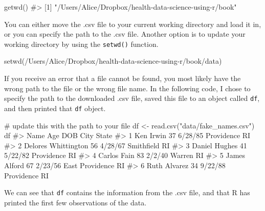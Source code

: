 \documentclass[
  letterpaper,
]{latex/krantz}
\makeatletter
\newenvironment{Shaded}{\begin{snugshade}}{\end{snugshade}}
\newcommand{\CommentTok}[1]{\textcolor[rgb]{0.37,0.37,0.37}{#1}}
\newcommand{\FunctionTok}[1]{\textcolor[rgb]{0.28,0.35,0.67}{#1}}
\newcommand{\NormalTok}[1]{\textcolor[rgb]{0.00,0.23,0.31}{#1}}
\newcommand{\OtherTok}[1]{\textcolor[rgb]{0.00,0.23,0.31}{#1}}
\newcommand{\StringTok}[1]{\textcolor[rgb]{0.13,0.47,0.30}{#1}}
\newenvironment{kframe}{%
\medskip{}
\setlength{\fboxsep}{.8em}
 \def\at@end@of@kframe{}%
 \ifinner\ifhmode%
  \def\at@end@of@kframe{\end{minipage}}%
  \begin{minipage}{\columnwidth}%
 \fi\fi%
 \def\FrameCommand##1{\hskip\@totalleftmargin \hskip-\fboxsep
 \colorbox{shadecolor}{##1}\hskip-\fboxsep
     \hskip-\linewidth \hskip-\@totalleftmargin \hskip\columnwidth}%
 \MakeFramed {\advance\hsize-\width
   \@totalleftmargin\z@ \linewidth\hsize
   \@setminipage}}%
 {\par\unskip\endMakeFramed%
 \at@end@of@kframe}
\renewenvironment{Shaded}{\begin{kframe}}{\end{kframe}}
\makeatother
\begin{document}
\begin{Shaded}
\begin{Highlighting}[]
\FunctionTok{getwd}\NormalTok{()}
\CommentTok{\#\textgreater{} [1] "/Users/Alice/Dropbox/health{-}data{-}science{-}using{-}r/book"}
\end{Highlighting}
\end{Shaded}

You can either move the .csv file to your current working directory and
load it in, or you can specify the path to the .csv file. Another option
is to update your working directory by using the
\texttt{setwd()} function.

\begin{Shaded}
\begin{Highlighting}[]
\FunctionTok{setwd}\NormalTok{(}\StringTok{\textquotesingle{}/Users/Alice/Dropbox/health{-}data{-}science{-}using{-}r/book/data\textquotesingle{}}\NormalTok{)}
\end{Highlighting}
\end{Shaded}

If you receive an error that a file cannot be found, you most likely
have the wrong path to the file or the wrong file name. In the following
code, I chose to specify the path to the downloaded .csv file, saved
this file to an object called \texttt{df}, and then printed that
\texttt{df} object.

\begin{Shaded}
\begin{Highlighting}[]
\CommentTok{\# update this with the path to your file}
\NormalTok{df }\OtherTok{\textless{}{-}} \FunctionTok{read.csv}\NormalTok{(}\StringTok{"data/fake\_names.csv"}\NormalTok{) }
\NormalTok{df}
\CommentTok{\#\textgreater{}                  Name Age     DOB            City State}
\CommentTok{\#\textgreater{} 1           Ken Irwin  37 6/28/85      Providence    RI}
\CommentTok{\#\textgreater{} 2 Delores Whittington  56 4/28/67      Smithfield    RI}
\CommentTok{\#\textgreater{} 3       Daniel Hughes  41 5/22/82      Providence    RI}
\CommentTok{\#\textgreater{} 4         Carlos Fain  83  2/2/40          Warren    RI}
\CommentTok{\#\textgreater{} 5        James Alford  67 2/23/56 East Providence    RI}
\CommentTok{\#\textgreater{} 6        Ruth Alvarez  34 9/22/88      Providence    RI}
\end{Highlighting}
\end{Shaded}

We can see that \texttt{df} contains the information from the .csv file,
and that R has printed the first few observations of the data.
\end{document}
